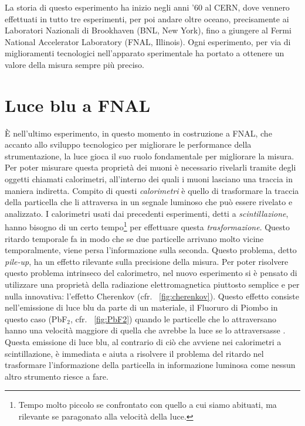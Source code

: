 La storia di questo esperimento ha inizio negli anni '60 al CERN, dove vennero effettuati in tutto tre esperimenti, per poi andare oltre oceano, precisamente ai Laboratori Nazionali di Brookhaven (BNL, New York), fino a giungere al Fermi National Accelerator Laboratory (FNAL, Illinois). Ogni esperimento, per via di miglioramenti tecnologici nell'apparato sperimentale ha portato a ottenere un valore della misura sempre più preciso.

\section*{Luce blu a FNAL}
È nell'ultimo esperimento, in questo momento in costruzione a FNAL, che accanto allo sviluppo tecnologico per migliorare le performance della strumentazione, la luce gioca il suo ruolo fondamentale per migliorare la misura.
Per poter misurare questa proprietà dei muoni è necessario rivelarli tramite degli oggetti chiamati calorimetri, all'interno dei quali i muoni lasciano una traccia in maniera indiretta.
Compito di questi \emph{calorimetri} è quello di trasformare la traccia della particella che li attraversa in un segnale luminoso che può essere rivelato e analizzato. I calorimetri usati dai precedenti esperimenti, detti a \emph{scintillazione}, hanno bisogno di un certo tempo\footnote{Tempo molto piccolo se confrontato con quello a cui siamo abituati, ma rilevante se paragonato alla velocità della luce.} per effettuare questa \emph{trasformazione}. Questo ritardo temporale fa in modo che se due particelle arrivano molto vicine temporalmente, viene persa l'informazione sulla seconda. Questo problema, detto \emph{pile-up}, ha un effetto rilevante sulla precisione della misura.
Per poter risolvere questo problema intrinseco del calorimetro, nel nuovo esperimento si è pensato di utilizzare una proprietà della radiazione elettromagnetica piuttosto semplice e per nulla innovativa: l'effetto Cherenkov (cfr. \figurename~\ref{fig:cherenkov}).
Questo effetto consiste nell'emissione di luce blu da parte di un materiale, il Fluoruro di Piombo in questo caso (PbF$_2$, cfr. \figurename~\ref{fig:PbF2}) quando le particelle che lo attraversano hanno una velocità maggiore di quella che avrebbe la luce se lo attraversasse \cite{Fien, Ach}.
Questa emissione di luce blu, al contrario di ciò che avviene nei calorimetri a scintillazione, è immediata e aiuta a risolvere il problema del ritardo nel trasformare l'informazione della particella in informazione luminosa come nessun altro strumento riesce a fare.

